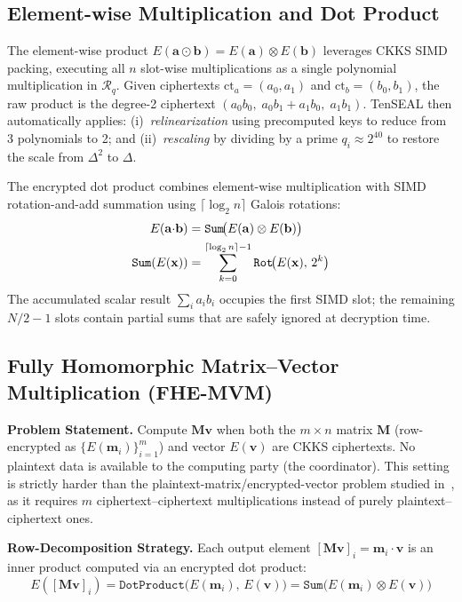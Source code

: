 \documentclass[conference]{IEEEtran}
\begin{document}
\subsection{Element-wise Multiplication and Dot Product}

The element-wise product $E(\mathbf{a} \odot \mathbf{b}) = E(\mathbf{a}) \otimes E(\mathbf{b})$ leverages CKKS SIMD packing, executing all $n$ slot-wise multiplications as a single polynomial multiplication in $\mathcal{R}_q$. Given ciphertexts $\text{ct}_a=(a_0,a_1)$ and $\text{ct}_b=(b_0,b_1)$, the raw product is the degree-2 ciphertext $(a_0b_0,\; a_0b_1{+}a_1b_0,\; a_1b_1)$. TenSEAL then automatically applies: (i)~\emph{relinearization} using precomputed keys to reduce from 3 polynomials to 2; and (ii)~\emph{rescaling} by dividing by a prime $q_i \approx 2^{40}$ to restore the scale from $\Delta^2$ to $\Delta$.

The encrypted dot product combines element-wise multiplication with SIMD rotation-and-add summation using $\lceil\log_2 n\rceil$ Galois rotations:
\begin{align}
    E(\mathbf{a}{\cdot}\mathbf{b}) &= \texttt{Sum}\!\big(E(\mathbf{a}) \otimes E(\mathbf{b})\big) \label{eq:dotprod}\\
    \texttt{Sum}(E(\mathbf{x})) &= \sum_{k=0}^{\lceil\log_2 n\rceil-1} \texttt{Rot}\!\big(E(\mathbf{x}),\,2^k\big) \notag
\end{align}
The accumulated scalar result $\sum_i a_i b_i$ occupies the first SIMD slot; the remaining $N/2 - 1$ slots contain partial sums that are safely ignored at decryption time.

\subsection{Fully Homomorphic Matrix--Vector Multiplication (FHE-MVM)}
\label{sec:fhe_matvec}

\textbf{Problem Statement.} Compute $\mathbf{Mv}$ when both the $m{\times}n$ matrix $\mathbf{M}$ (row-encrypted as $\{E(\mathbf{m}_i)\}_{i=1}^m$) and vector $E(\mathbf{v})$ are CKKS ciphertexts. No plaintext data is available to the computing party (the coordinator). This setting is strictly harder than the plaintext-matrix/encrypted-vector problem studied in~\cite{Halevi2014,Jiang2018}, as it requires $m$ ciphertext--ciphertext multiplications instead of purely plaintext--ciphertext ones.

\textbf{Row-Decomposition Strategy.} Each output element $[\mathbf{Mv}]_i = \mathbf{m}_i \cdot \mathbf{v}$ is an inner product computed via an encrypted dot product:
\begin{equation}
    E([\mathbf{Mv}]_i) = \texttt{DotProduct}\big(E(\mathbf{m}_i),\, E(\mathbf{v})\big) = \texttt{Sum}\big(E(\mathbf{m}_i) \otimes E(\mathbf{v})\big)
    \label{eq:fhe_matvec}
\end{equation}
\end{document}
